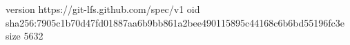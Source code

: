 version https://git-lfs.github.com/spec/v1
oid sha256:7905c1b70d47fd01887aa6b9bb861a2bee490115895c44168c6b6bd55196fc3e
size 5632
